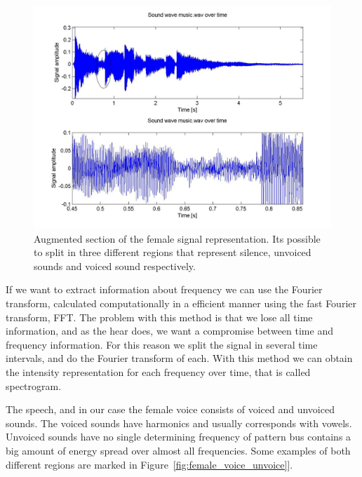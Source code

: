 \documentclass[a4paper]{article}
\begin{document}
\begin{itemize}
\begin{itemize}
			\begin{figure}[!ht]
			\centering
			\includegraphics[width=0.85\columnwidth]{figures/2_2.jpg}
			\caption{Augmented section of the female signal representation. Its possible to split in three different regions that
			 represent silence, unvoiced sounds and voiced sound respectively.}
			\label{fig:female_voice_augmented}
			\end{figure}

			\vspace{2mm}
	        		\noindent

			If we want to extract information about frequency we can use the Fourier transform, calculated 
			computationally in a efficient manner using the fast Fourier transform, FFT. The problem with this method 
			is that we lose all time information, and as the hear does, we want a compromise between time and frequency 
			information. For this reason we split the signal in several time intervals, and do the Fourier transform of each. 
			With this method we can obtain the intensity representation for each frequency over time, that is called 	
			spectrogram.

			\vspace{2mm}
	        		\noindent

			The speech, and in our case the female voice consists of voiced and unvoiced sounds. The
			voiced sounds have harmonics and usually corresponds with vowels. Unvoiced sounds have no single determining
			frequency of pattern bus contains a big amount of energy spread over almost all frequencies. Some examples of
			both different regions are marked in Figure~\ref{fig:female_voice_unvoice}].


\end{itemize}
\end{itemize}
\end{document}
